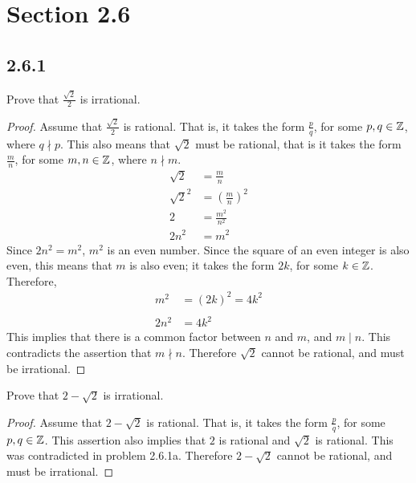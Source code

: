 





\section*{Section 2.6}

\subsection*{2.6.1}
\begin{enumerate}
   Prove that $\frac{\sqrt{2}}{2}$ is irrational.
  \begin{proof}
    Assume that $\frac{\sqrt{2}}{2}$ is rational. That is, it takes the form $\frac{p}{q}$, for some $p,q \in \mathbb{Z}$, where $q \nmid p$. This also means that $\sqrt{2}$ must be rational, that is it takes the form $\frac{m}{n}$, for some $m,n \in \mathbb{Z}$, where $n \nmid m$.
    \begin{align*}
      \sqrt{2}   & = \frac{m}{n}     \\
      \sqrt{2}^2 & = (\frac{m}{n})^2 \\
      2          & = \frac{m^2}{n^2} \\
      2n^2       & = m^2
    \end{align*}
    Since $2n^2 = m^2$, $m^2$ is an even number. Since the square of an even integer is also even, this means that $m$ is also even; it takes the form $2k$, for some $k \in \mathbb{Z}$. Therefore,
    \begin{align*}
      m^2  & = (2k)^2 = 4k^2 \\ \\
      2n^2 & = 4k^2
    \end{align*}
    This implies that there is a common factor between $n$ and $m$, and $m \mid n$. This contradicts the assertion that $m \nmid n$. Therefore $\sqrt{2}$ cannot be rational, and must be irrational.
  \end{proof}
   Prove that $2-\sqrt{2}$ is irrational.
  \begin{proof}
    Assume that $2 - \sqrt{2}$ is rational. That is, it takes the form $\frac{p}{q}$, for some $p,q \in \mathbb{Z}$. This assertion also implies that $2$ is rational and $\sqrt{2}$ is rational. This was contradicted in problem 2.6.1a. Therefore $2 - \sqrt{2}$ cannot be rational, and must be irrational.
  \end{proof}
\end{enumerate}

